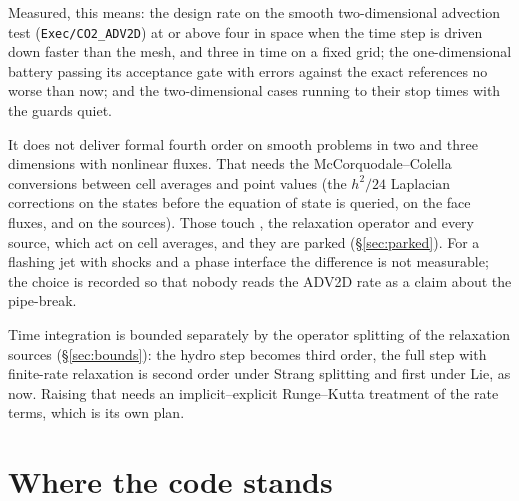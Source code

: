 \documentclass[11pt,a4paper]{article}
\newcommand{\code}[1]{\texttt{\small #1}}
\begin{document}
Measured, this means: the design rate on the smooth two-dimensional
advection test (\code{Exec/CO2\_ADV2D}) at or above four in space when the
time step is driven down faster than the mesh, and three in time on a fixed
grid; the one-dimensional battery passing its acceptance gate with errors
against the exact references no worse than now; and the two-dimensional
cases running to their stop times with the guards quiet.

It does not deliver formal fourth order on smooth problems in two and three
dimensions with nonlinear fluxes.  That needs the McCorquodale--Colella
conversions between cell averages and point values (the $h^2/24$ Laplacian
corrections on the states before the equation of state is queried, on the
face fluxes, and on the sources).  Those touch , the
relaxation operator and every source, which act on cell averages, and they
are parked (\S\ref{sec:parked}).  For a flashing jet with shocks and a
phase interface the difference is not measurable; the choice is recorded so
that nobody reads the ADV2D rate as a claim about the pipe-break.

Time integration is bounded separately by the operator splitting of the
relaxation sources (\S\ref{sec:bounds}): the hydro step becomes third
order, the full step with finite-rate relaxation is second order under
Strang splitting and first under Lie, as now.  Raising that needs an
implicit--explicit Runge--Kutta treatment of the rate terms, which is its
own plan.

\section{Where the code stands}
\label{sec:now}
\end{document}
